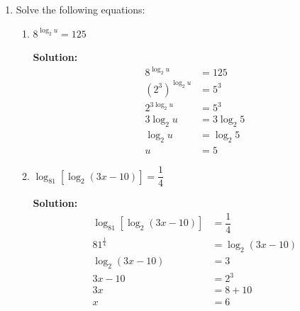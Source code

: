 \documentclass{report}
\newcommand{\sol}{\textbf{Solution:}}
\begin{document}
\begin{enumerate}[leftmargin=*]
\begin{enumerate}
              \item Sketch the graph of $y=\left|x^2-4\right|$ for $-3 \leqslant x \leqslant 3$.

                    \sol{}

                    Lazy to draw the graph. =)

          \end{enumerate}

    \item Solve the following equations:
          \begin{enumerate}
              \item $8^{\log _2 u}=125$

                    \sol{}
                    \begin{align*}
                        8^{\log _2 u}     & = 125         \\
                        (2^3)^{\log _2 u} & = 5^3         \\
                        2^{3 \log _2 u}   & = 5^3         \\
                        3 \log _2 u       & = 3 \log _2 5 \\
                        \log _2 u         & = \log _2 5   \\
                        u                 & = 5
                    \end{align*}

              \item $\log _{81}\left[\log _2(3 x-10)\right]=\dfrac{1}{4}$

                    \sol{}
                    \begin{align*}
                        \log _{81}\left[\log _2(3 x-10)\right] & = \dfrac{1}{4}    \\
                        81^{\frac{1}{4}}                       & = \log _2(3 x-10) \\
                        \log_2(3 x-10)                         & = 3               \\
                        3x-10                                  & = 2^3             \\
                        3x                                     & = 8+10            \\
                        x                                      & = 6
                    \end{align*}
          \end{enumerate}


\end{enumerate}
\end{document}
